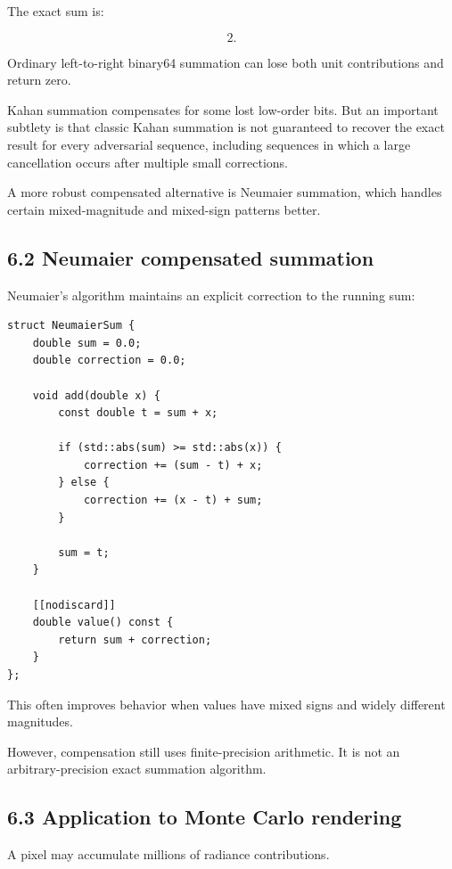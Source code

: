 The exact sum is:

\[ \boxed{2}. \]

Ordinary left-to-right binary64 summation can lose both unit contributions and return zero.

Kahan summation compensates for some lost low-order bits. But an important subtlety is that classic Kahan summation is not guaranteed to recover the exact result for every adversarial sequence, including sequences in which a large cancellation occurs after multiple small corrections.

A more robust compensated alternative is Neumaier summation, which handles certain mixed-magnitude and mixed-sign patterns better.

\subsection{6.2 Neumaier compensated summation}\label{02-foundations-ii-ch028-neumaier-compensated-summation}

Neumaier's algorithm maintains an explicit correction to the running sum:

\begin{verbatim}
struct NeumaierSum {
    double sum = 0.0;
    double correction = 0.0;

    void add(double x) {
        const double t = sum + x;

        if (std::abs(sum) >= std::abs(x)) {
            correction += (sum - t) + x;
        } else {
            correction += (x - t) + sum;
        }

        sum = t;
    }

    [[nodiscard]]
    double value() const {
        return sum + correction;
    }
};
\end{verbatim}

This often improves behavior when values have mixed signs and widely different magnitudes.

However, compensation still uses finite-precision arithmetic. It is not an arbitrary-precision exact summation algorithm.

\subsection{6.3 Application to Monte Carlo rendering}\label{02-foundations-ii-ch028-application-to-monte-carlo-rendering}

A pixel may accumulate millions of radiance contributions.

